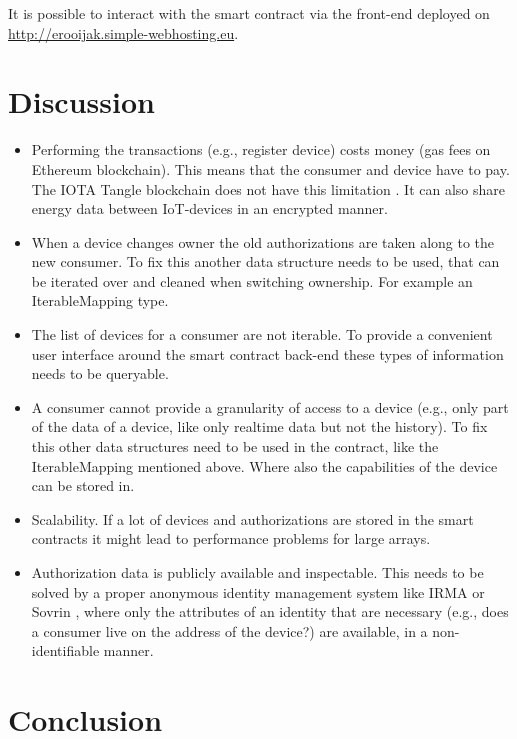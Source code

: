 \documentclass[paper=a4, fontsize=11pt]{scrartcl}
\numberwithin{equation}{section} %
\numberwithin{figure}{section}   %
\numberwithin{table}{section}    %
\begin{document}
It is possible to interact with the smart contract via the front-end deployed on
\url{http://erooijak.simple-webhosting.eu}.\\

\section{Discussion}

\begin{itemize}
\item Performing the transactions (e.g., register device) costs money (gas fees
  on Ethereum blockchain). This means that the consumer and device have to pay.
  The IOTA Tangle blockchain does not have this limitation \cite{iota}. It can
  also share energy data between IoT-devices in an encrypted manner.
\item When a device changes owner the old authorizations are taken along to the
  new consumer. To fix this another data structure needs to be used, that can be
  iterated over and cleaned when switching ownership. For example an
  IterableMapping type.
\item The list of devices for a consumer are not iterable. To provide a
  convenient user interface around the smart contract back-end these types of
  information needs to be queryable.
\item A consumer cannot provide a granularity of access to a device (e.g., only
  part of the data of a device, like only realtime data but not the history). To
  fix this other data structures need to be used in the contract, like the
  IterableMapping mentioned above. Where also the capabilities of the device can
  be stored in.
\item Scalability. If a lot of devices and authorizations are stored in the
  smart contracts it might lead to performance problems for large arrays.
\item Authorization data is publicly available and inspectable. This needs to be
  solved by a proper anonymous identity management system like IRMA \cite{irma}
  or Sovrin \cite{sovrin}, where only the attributes of an identity that are
  necessary (e.g., does a consumer live on the address of the device?) are
  available, in a non-identifiable manner.
\end{itemize}

\section{Conclusion}
\end{document}

